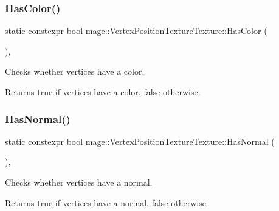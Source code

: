 \subsubsection{\texorpdfstring{Has\+Color()}{HasColor()}}
{\footnotesize\ttfamily static constexpr bool mage\+::\+Vertex\+Position\+Texture\+Texture\+::\+Has\+Color (\begin{DoxyParamCaption}{ }\end{DoxyParamCaption})\hspace{0.3cm}{\ttfamily [static]}, {\ttfamily [noexcept]}}

Checks whether vertices have a color.

\begin{DoxyReturn}{Returns}
{\ttfamily true} if vertices have a color. {\ttfamily false} otherwise. 
\end{DoxyReturn}
\hypertarget{structmage_1_1_vertex_position_texture_texture_ae61b4c7a1b5efeb6894c910202f8b246}{}\label{structmage_1_1_vertex_position_texture_texture_ae61b4c7a1b5efeb6894c910202f8b246} 
\subsubsection{\texorpdfstring{Has\+Normal()}{HasNormal()}}
{\footnotesize\ttfamily static constexpr bool mage\+::\+Vertex\+Position\+Texture\+Texture\+::\+Has\+Normal (\begin{DoxyParamCaption}{ }\end{DoxyParamCaption})\hspace{0.3cm}{\ttfamily [static]}, {\ttfamily [noexcept]}}

Checks whether vertices have a normal.

\begin{DoxyReturn}{Returns}
{\ttfamily true} if vertices have a normal. {\ttfamily false} otherwise. 
\end{DoxyReturn}
\hypertarget{structmage_1_1_vertex_position_texture_texture_ae89995d8e461d3ee461cd55ce214c749}{}\label{structmage_1_1_vertex_position_texture_texture_ae89995d8e461d3ee461cd55ce214c749} 
